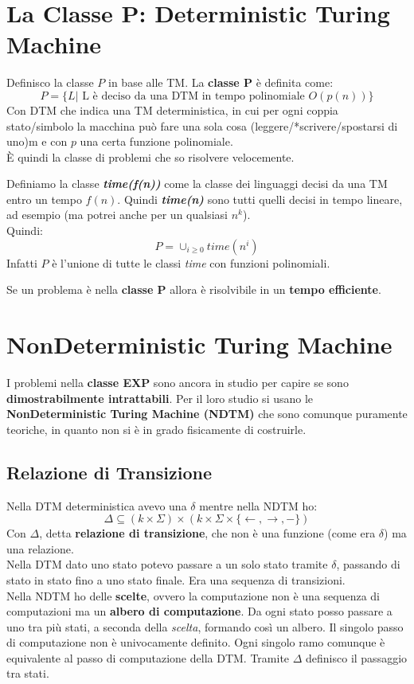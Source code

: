 \section{La Classe P: Deterministic Turing Machine}
\begin{definizione}
  Definisco la classe $P$ in base alle TM. La \textbf{classe P} è definita come:
  \[P=\{L|\mbox{ L è deciso da una DTM in tempo polinomiale } O(p(n))\}\]
  Con DTM che indica una TM deterministica, in cui per ogni coppia stato/simbolo
  la macchina può fare una sola cosa (leggere/*scrivere/spostarsi di uno)m e con
  $p$ una certa funzione polinomiale.\\
  È quindi la classe di problemi che so risolvere velocemente.
\end{definizione}
\begin{definizione}
  Definiamo la classe \textbf{\textit{time(f(n))}} come la classe dei linguaggi
  decisi da una TM entro un tempo $f(n)$. Quindi \textbf{\textit{time(n)}} sono
  tutti quelli decisi in tempo lineare, ad esempio (ma potrei anche per un
  qualsiasi $n^k$).\\
  Quindi:
  \[P=\cup_{i\geq 0} time(n^i)\]
  Infatti $P$ è l'unione di tutte le classi \textit{time} con funzioni
  polinomiali. 
\end{definizione}
\begin{definizione}
  Se un problema è nella \textbf{classe P} allora è risolvibile in un
  \textbf{tempo efficiente}.
\end{definizione}
\section{NonDeterministic Turing Machine}
I problemi nella \textbf{classe EXP} sono ancora in studio per capire se sono
\textbf{dimostrabilmente intrattabili}. Per il loro studio
si usano le \textbf{NonDeterministic Turing Machine (NDTM)} che sono comunque
puramente teoriche, in quanto non si è in grado fisicamente di costruirle. 
\subsection{Relazione di Transizione}
Nella DTM deterministica avevo una $\delta$ mentre nella NDTM ho:
\[\Delta\subseteq (k\times \Sigma)\times (k\times \Sigma \times\{\leftarrow,
  \rightarrow, -\})\]
Con $\Delta$, detta \textbf{relazione di transizione}, che non è una funzione
(come era $\delta$) ma una relazione.\\ 
Nella DTM dato uno stato potevo passare a un solo stato tramite $\delta$,
passando di stato in stato fino a uno stato finale. Era una sequenza di
transizioni. \\
Nella NDTM ho delle \textbf{scelte}, ovvero la computazione non è una sequenza
di computazioni ma un \textbf{albero di computazione}. Da ogni stato posso
passare a uno tra più stati, a seconda della \textit{scelta}, formando così un
albero. Il singolo passo di computazione non è univocamente definito. Ogni
singolo ramo comunque è equivalente al passo di computazione della DTM. Tramite
$\Delta$ definisco il passaggio tra stati.\\
